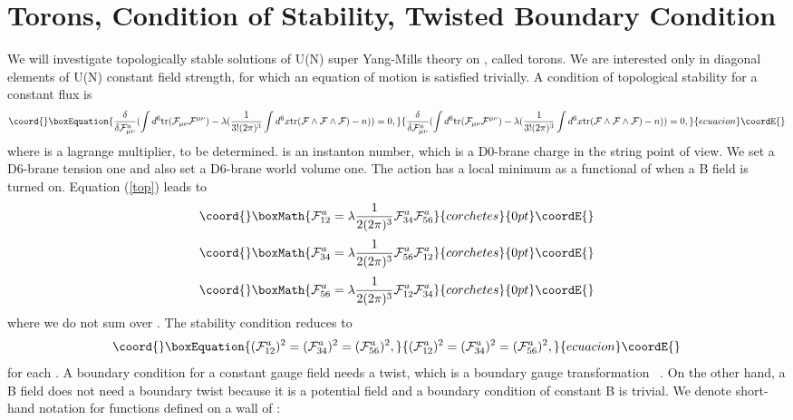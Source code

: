 \documentclass[a4paper,12pt]{article}
\providecommand{\tr}{\mbox{tr}}
\begin{document}
\section{Torons, Condition of Stability, Twisted Boundary Condition}
We will investigate topologically stable solutions of U(N) super Yang-Mills theory on \coordHE{}, called torons. We are interested only in diagonal elements of U(N) constant field strength, for which an equation of motion is satisfied trivially. A condition of topological stability for a constant flux \coordHE{} is ~\cite{taylor}
\begin{equation}\coord{}\boxEquation{
\frac{\delta}{\delta \mathcal{F}_{\mu \nu}^a}(\int d^6 \tr(\mathcal{F}_{\mu \nu}\mathcal{F}^{\mu \nu})-\lambda( \frac{1}{3!(2\pi)^3}\int d^6x \tr(\mathcal{F} \wedge \mathcal{F} \wedge \mathcal{F})-n))=0, \label{top}
}{
\frac{\delta}{\delta \mathcal{F}_{\mu \nu}^a}(\int d^6 \tr(\mathcal{F}_{\mu \nu}\mathcal{F}^{\mu \nu})-\lambda( \frac{1}{3!(2\pi)^3}\int d^6x \tr(\mathcal{F} \wedge \mathcal{F} \wedge \mathcal{F})-n))=0, }{ecuacion}\coordE{}\end{equation}
where \myHighlight{$\lambda$}\coordHE{} is a lagrange multiplier, to be determined. \coordHE{} is an instanton number, which is a D0-brane charge in the string point of view. We set a D6-brane tension one and also set a D6-brane world volume one. The action has a local minimum as a functional of \coordHE{} when a B field is turned on. Equation (\ref{top}) leads to 
\[\coord{}\boxMath{\mathcal{F}_{12}^a = \lambda \frac{1}{2(2\pi)^3}\mathcal{F}_{34}^a\mathcal{F}_{56}^a }{corchetes}{0pt}\coordE{}\]  
\[\coord{}\boxMath{\mathcal{F}_{34}^a = \lambda \frac{1}{2(2\pi)^3}\mathcal{F}_{56}^a\mathcal{F}_{12}^a }{corchetes}{0pt}\coordE{}\]  
\[\coord{}\boxMath{\mathcal{F}_{56}^a = \lambda \frac{1}{2(2\pi)^3}\mathcal{F}_{12}^a\mathcal{F}_{34}^a }{corchetes}{0pt}\coordE{}\] 
where we do not sum over \coordHE{}.
The stability condition reduces to
\begin{equation}\coord{}\boxEquation{
(\mathcal{F}_{12}^a)^2=(\mathcal{F}_{34}^a)^2=(\mathcal{F}_{56}^a)^2, \label{eq:stability}
}{
(\mathcal{F}_{12}^a)^2=(\mathcal{F}_{34}^a)^2=(\mathcal{F}_{56}^a)^2, }{ecuacion}\coordE{}\end{equation} 
for each \coordHE{}. A boundary condition for a constant gauge field \coordHE{} needs a twist, which is a boundary gauge transformation ~\cite{thooft}. On the other hand, a B field does not need a boundary twist because it is a potential field and a boundary condition of constant B is trivial. We denote short-hand notation for functions defined on a wall of \coordHE{}:
\end{document}

